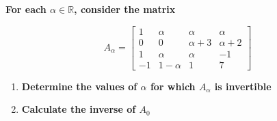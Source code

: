 \item \textbf{For each $\alpha\in\mathbb{R}$, consider the matrix}

$$
A_\alpha=
\begin{bmatrix}
    1 & \alpha & \alpha & \alpha\\
    0 & 0 & \alpha+3 & \alpha+2\\
    1 & \alpha & \alpha & -1\\
    -1 & 1-\alpha & 1 & 7
\end{bmatrix}
$$

\begin{enumerate}[label=\alph*)]

    \item \textbf{Determine the values of $\alpha$ for which $A_\alpha$ is invertible}
    
    
    \item \textbf{Calculate the inverse of $A_0$}
    

\end{enumerate}
